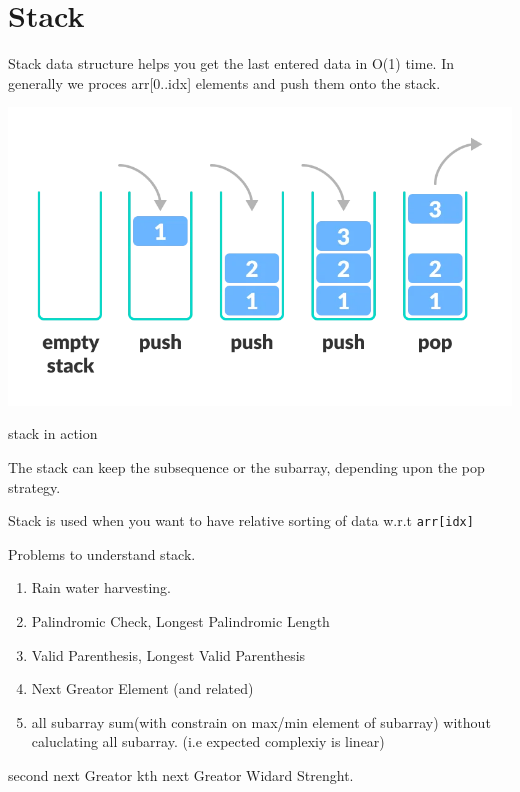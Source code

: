 \chapter{Stack}\label{chp:stack}

Stack data structure helps you get the last entered data in O(1) time.
In generally we proces arr[0..idx] elements and push them onto the stack.

\begin{marginfigure}  
\includegraphics[width=\marginparwidth]{../resources/stack_intro.png}
\caption{stack in action}
\end{marginfigure}

The stack can keep the subsequence or the subarray, depending upon the pop strategy.

Stack is used when you want to have relative sorting of data w.r.t \verb|arr[idx]|

Problems to understand stack.
\begin{exercise}
    \begin{enumerate}
        \item Rain water harvesting.
        \item Palindromic Check, Longest Palindromic Length
        \item Valid Parenthesis, Longest Valid Parenthesis
        \item Next Greator Element (and related)
        \item all subarray sum(with constrain on max/min element of subarray) without caluclating all subarray. (i.e expected complexiy is linear)
    \end{enumerate}
\end{exercise}

second next Greator
kth next Greator
Widard Strenght.



